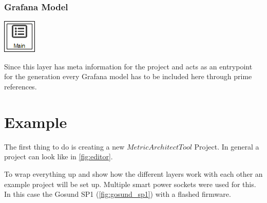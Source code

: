 \subsubsection{Grafana Model}
\noindent\begin{minipage}{0.15\textwidth}%
	\includegraphics[width=\linewidth]{assets/images/project}
\end{minipage}%
\hfill%
\begin{minipage}{0.8\textwidth}
	Since this layer has meta information for the project and acts as an entrypoint for the generation every Grafana model has to be included here through prime references.
\end{minipage}

\section{Example}

The first thing to do is creating a new $MetricArchitectTool$ Project. In general a project can look like in \cref{fig:editor}.  

To wrap everything up and show how the different layers work with each other an example project will be set up. Multiple smart power sockets were used for this. In this case the Gosund SP1 (\cref{fig:gosund_sp1}) with a flashed firmware. 

